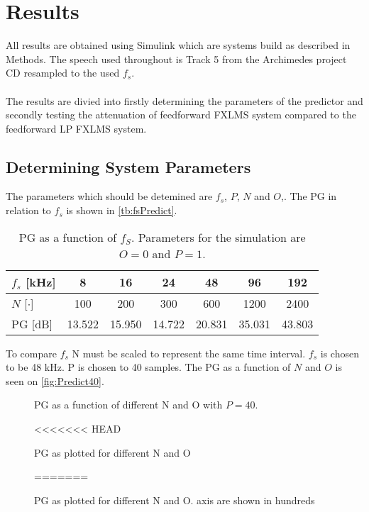 \section{Results}
All results are obtained using Simulink\textsuperscript{\textregistered} which are systems build as described in Methods. The speech used throughout is Track 5 from the Archimedes project CD resampled to the used $f_s$.  
\\\\
The results are divied into firstly determining the parameters of the predictor and secondly testing the attenuation of feedforward FXLMS system compared to the feedforward LP FXLMS system.   

\subsection{Determining System Parameters}
The parameters which should be detemined are $f_s$, $P$, $N$ and $O$,.         
The PG in relation to $f_s$ is shown in \autoref{tb:fsPredict}.

\begin{table}[H]
\centering
\begin{tabular}{|l|c|c|c|c|c|c|}
\hline
$f_s$ {[}kHz{]} & 8 & 16 & 24 & 48 & 96 & 192 \\ \hline 
$N$ {[}$\cdot${]} & 100 & 200 & 300 & 600 & 1200 & 2400 \\ \hline 
PG {[}dB{]} & 13.522 & 15.950 & 14.722 & 20.831 & 35.031 & 43.803 \\ \hline
\end{tabular}
\caption{PG as a function of $f_S$. Parameters for the simulation are $O=0$ and $P=1$.}
\label{tb:fsPredict}
\end{table}

To compare $f_s$ N must be scaled to represent the same time interval. $f_s$ is chosen to be 48 kHz. P is chosen to 40 samples.  
The PG as a function of $N$ and $O$ is seen on \autoref{fig:Predict40}. 

\begin{figure}[H]
	\centering
	
	\caption{PG as a function of different N and O with $P=40$.}
	\label{fig:Predict40}
\end{figure}

\begin{figure}[H]
	\centering
	
<<<<<<< HEAD
	\caption{PG as plotted for different N and O}
	\label{fig:Predict10}
=======
	\caption{PG as plotted for different N and O. axis are shown in hundreds}
	\label{fig:PredictN}
\end{figure}


